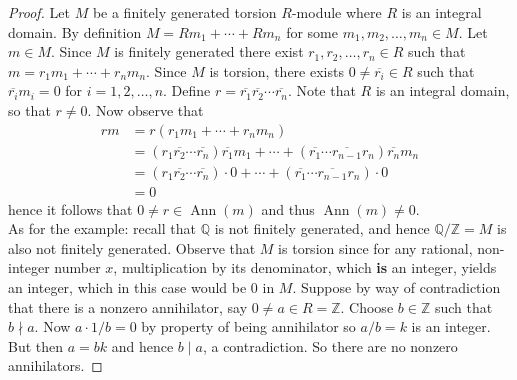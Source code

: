 \documentclass[8pt]{amsart}
\theoremstyle{plain}%
\theoremstyle{definition}
\theoremstyle{remark}
\numberwithin{equation}{section}
\newcommand{\Z}{\mathbb{Z}}
\newcommand{\Q}{\mathbb{Q}}
\begin{document}
	\begin{proof}
		Let $M$ be a finitely generated torsion $R$-module where $R$ is an integral domain. By definition $M = Rm_1 + \cdots + Rm_n$ for some $m_1, m_2, \ldots, m_n \in M$. Let $m \in M$. Since $M$ is finitely generated there exist $r_1, r_2, \ldots, r_n \in R$ such that $m = r_1m_1 + \cdots + r_nm_n$. Since $M$ is torsion, there exists $0 \neq \overline{r_i} \in R$ such that $\overline{r_i}m_i = 0$ for $i = 1, 2, \ldots, n$. Define $r = \overline{r_1} \overline{r_2} \cdots \overline{r_n}$. Note that $R$ is an integral domain, so that $r \neq 0$. Now observe that
		\begin{align*}
			rm &= r(r_1m_1 + \cdots + r_nm_n)\\
			&= (r_1 \overline{r_2} \cdots \overline{r_n})\overline{r_1}m_1 + \cdots + (\overline{r_1} \cdots \overline{r_{n-1}} r_n) \overline{r_n}m_n\\
			&= (r_1 \overline{r_2} \cdots \overline{r_n}) \cdot 0 + \cdots + (\overline{r_1} \cdots \overline{r_{n-1}} r_n) \cdot 0\\
			&= 0
		\end{align*}
		hence it follows that $0 \neq r \in \operatorname{Ann}(m)$ and thus $\operatorname{Ann}(m) \neq 0$.\\

		As for the example: recall that $\Q$ is not finitely generated, and hence $\Q/\Z = M$ is also not finitely generated. Observe that $M$ is torsion since for any rational, non-integer number $x$, multiplication by its denominator, which \textbf{is} an integer, yields an integer, which in this case would be 0 in $M$. Suppose by way of contradiction that there is a nonzero annihilator, say $0 \neq a \in R = \Z$. Choose $b \in \Z$ such that $b \nmid a$. Now $a \cdot 1/b = 0$ by property of being annihilator so $a/b = k$ is an integer. But then $a = bk$ and hence $b \mid a$, a contradiction. So there are no nonzero annihilators.
	\end{proof}
\end{document}
